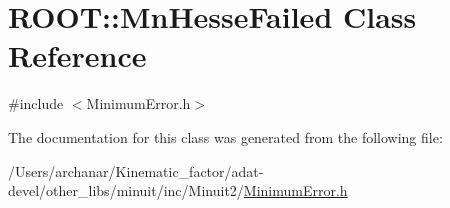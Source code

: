 \hypertarget{classROOT_1_1Minuit2_1_1MinimumError_1_1MnHesseFailed}{}\section{R\+O\+OT\+:\+:Mn\+Hesse\+Failed Class Reference}
\label{classROOT_1_1Minuit2_1_1MinimumError_1_1MnHesseFailed}


{\ttfamily \#include $<$Minimum\+Error.\+h$>$}



The documentation for this class was generated from the following file\+:\begin{DoxyCompactItemize}
\item 
/\+Users/archanar/\+Kinematic\+\_\+factor/adat-\/devel/other\+\_\+libs/minuit/inc/\+Minuit2/\mbox{\hyperlink{adat-devel_2other__libs_2minuit_2inc_2Minuit2_2MinimumError_8h}{Minimum\+Error.\+h}}\end{DoxyCompactItemize}
